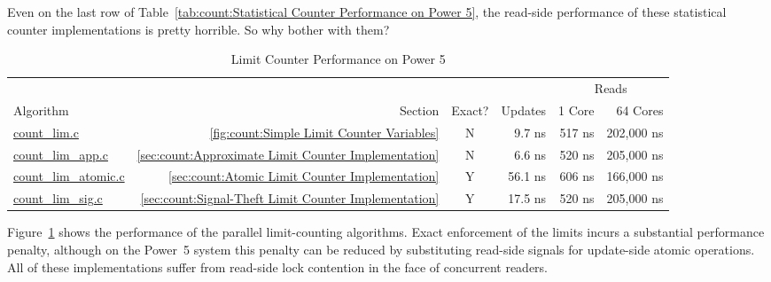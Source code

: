 \QuickQuiz{}
	Even on the last row of
	Table~\ref{tab:count:Statistical Counter Performance on Power 5},
	the read-side performance of these statistical counter
	implementations is pretty horrible.
	So why bother with them?
 \QuickQuizEnd

\begin{table}
\begin{center}
\begin{tabular}{l|r|c|r|r|r}
	& & & & \multicolumn{2}{|c}{Reads} \\
	\cline{5-6}
	Algorithm & Section & Exact? & Updates & 1 Core & 64 Cores \\
	\hline
	\hline
	\url{count_lim.c} & \ref{fig:count:Simple Limit Counter Variables} &
		N & 9.7 ns & 517 ns & 202,000 ns \\
	\url{count_lim_app.c} & \ref{sec:count:Approximate Limit Counter Implementation} &
		N & 6.6 ns & 520 ns & 205,000 ns \\
	\url{count_lim_atomic.c} & \ref{sec:count:Atomic Limit Counter Implementation} &
		Y & 56.1 ns & 606 ns & 166,000 ns \\
	\url{count_lim_sig.c} & \ref{sec:count:Signal-Theft Limit Counter Implementation} &
		Y & 17.5 ns & 520 ns & 205,000 ns \\
\end{tabular}
\end{center}
\caption{Limit Counter Performance on Power 5}
\label{tab:count:Limit Counter Performance on Power 5}
\end{table}

Figure~\ref{tab:count:Limit Counter Performance on Power 5}
shows the performance of the parallel limit-counting algorithms.
Exact enforcement of the limits incurs a substantial performance
penalty, although on the Power~5 system this penalty can be reduced
by substituting read-side signals for update-side atomic operations.
All of these implementations suffer from read-side lock contention
in the face of concurrent readers.

